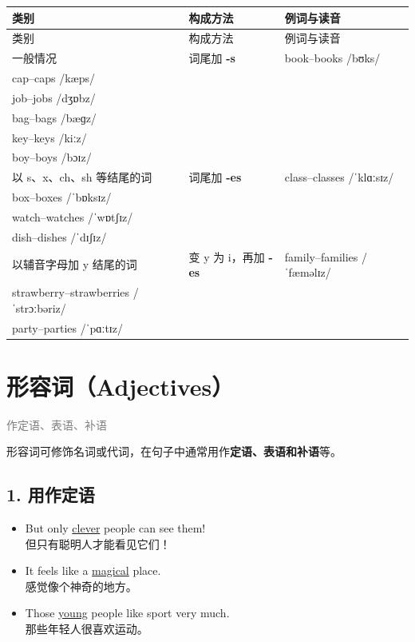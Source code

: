 \documentclass[11pt,a4paper]{ctexart}
\begin{document}
{\footnotesize
\begin{longtable}{p{4.47cm}p{4.47cm}p{4.47cm}}
\hline
类别 & 构成方法 & 例词与读音 \\
\hline
\endfirsthead
\hline
类别 & 构成方法 & 例词与读音 \\
\hline
\endhead
\hline
\endfoot
一般情况 & 词尾加 \textbf{-s} & book–books /bʊks/\\ cap–caps /kæps/\\ job–jobs /dʒɒbz/\\ bag–bags /bæɡz/\\ key–keys /kiːz/\\ boy–boys /bɔɪz/ \\
以 s、x、ch、sh 等结尾的词 & 词尾加 \textbf{-es} & class–classes /ˈklɑːsɪz/\\ box–boxes /ˈbɒksɪz/\\ watch–watches /ˈwɒtʃɪz/\\ dish–dishes /ˈdɪʃɪz/ \\
以辅音字母加 y 结尾的词 & 变 y 为 i，再加 \textbf{-es} & family–families /ˈfæməlɪz/\\ strawberry–strawberries /ˈstrɔːbəriz/\\ party–parties /ˈpɑːtɪz/ \\
\end{longtable}
}

\begin{center}\end{center}

\section{形容词（Adjectives）}
\noindent\textcolor{gray}{作定语、表语、补语}\par\smallskip
形容词可修饰名词或代词，在句子中通常用作\textbf{定语、表语和补语}等。

\subsection*{1. 用作定语}

\begin{itemize}[leftmargin=1.4em]
\item But only \underline{clever} people can see them!\\ 但只有聪明人才能看见它们！
\item It feels like a \underline{magical} place.\\ 感觉像个神奇的地方。
\item Those \underline{young} people like sport very much.\\ 那些年轻人很喜欢运动。
\end{itemize}
\end{document}
